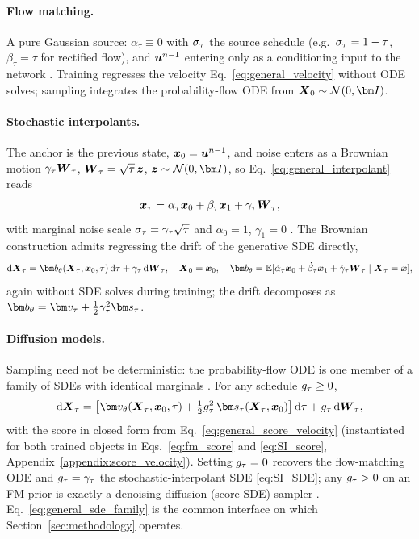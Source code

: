 \paragraph{Flow matching.}
A pure Gaussian source: $\alpha_\tau\equiv 0$ with $\sigma_\tau$ the source schedule (e.g.\ $\sigma_\tau=1-\tau$, $\beta_\tau=\tau$ for rectified flow), and $\boldsymbol{u}^{n-1}$ entering only as a conditioning input to the network \cite{lipman_flow_2023, liu_rectified_2022}. Training regresses the velocity Eq.~\eqref{eq:general_velocity} without ODE solves; sampling integrates the probability-flow ODE from $\bX_0\sim\mathcal{N}(0,\bI)$.

\paragraph{Stochastic interpolants.}
The anchor is the previous state, $\boldsymbol{x}_0=\boldsymbol{u}^{n-1}$, and noise enters as a Brownian motion $\gamma_\tau\boldsymbol{W}_\tau$, $\boldsymbol{W}_\tau=\sqrt\tau\,\boldsymbol{z}$, $\bz\sim\mathcal{N}(0,\bI)$, so Eq.~\eqref{eq:general_interpolant} reads
\begin{align}\label{eq:stochastic_interpolant}
    \boldsymbol{x}_\tau = \alpha_\tau\boldsymbol{x}_0 + \beta_\tau\boldsymbol{x}_1 + \gamma_\tau\boldsymbol{W}_\tau,
\end{align}
with marginal noise scale $\sigma_\tau=\gamma_\tau\sqrt\tau$ and $\alpha_0=1$, $\gamma_1=0$ \cite{albergo_stochastic_2023, chen_probabilistic_2024}. The Brownian construction admits regressing the drift of the generative SDE directly,
\begin{align}\label{eq:SI_SDE}
    \rd\bX_\tau = \drift_\theta(\bX_\tau,\bx_0,\tau)\,\rd\tau + \gamma_\tau\,\rd\bW_\tau, \quad \bX_0=\bx_0, \quad
    \drift_\theta = \E[\dot\alpha_\tau\bx_0 + \dot\beta_\tau\bx_1 + \dot\gamma_\tau\bW_\tau\mid\bX_\tau=\bx],
\end{align}
again without SDE solves during training; the drift decomposes as $\drift_\theta = \fmvel_\tau + \tfrac12\gamma_\tau^2\genscore_\tau$.

\paragraph{Diffusion models.}
Sampling need not be deterministic: the probability-flow ODE is one member of a family of SDEs with identical marginals \cite{song_score-based_2021, ma_sit_2024}. For any schedule $g_\tau\ge 0$,
\begin{align}\label{eq:general_sde_family}
    \rd\bX_\tau
    = \big[\fmvel_\theta(\bX_\tau,\bx_0,\tau) + \tfrac{1}{2}\gdiff_\tau^2\,\genscore_\tau(\bX_\tau,\bx_0)\big]\,\rd\tau
    + \gdiff_\tau\,\rd\bW_\tau,
\end{align}
with the score in closed form from Eq.~\eqref{eq:general_score_velocity} (instantiated for both trained objects in Eqs.~\eqref{eq:fm_score} and \eqref{eq:SI_score}, Appendix~\ref{appendix:score_velocity}). Setting $g_\tau=0$ recovers the flow-matching ODE and $g_\tau=\gamma_\tau$ the stochastic-interpolant SDE \eqref{eq:SI_SDE}; any $g_\tau>0$ on an FM prior is exactly a denoising-diffusion (score-SDE) sampler \cite{song_score-based_2021, ho_denoising_2020}. Eq.~\eqref{eq:general_sde_family} is the common interface on which Section~\ref{sec:methodology} operates.
